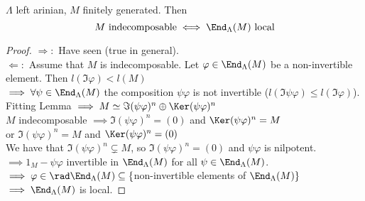 \begin{thm}
$\Lambda$ left arinian, $M$ finitely generated. Then \[M \text{ indecomposable} \iff \End_\Lambda(M) \text{ local}\]
\begin{proof}
\underline{$\Rightarrow:$} Have seen (true in general).\\
\underline{$\Leftarrow:$} Assume that $M$ is indecomposable. Let $\varphi \in \End_\Lambda(M)$ be a non-invertible element. Then $l(\Im \varphi) < l(M)$\\
$\implies \forall \psi \in \End_\Lambda(M)$ the composition $\psi\varphi$ is not invertible ($l(\Im \psi\varphi) \leq l(\Im \varphi)$).\\
Fitting Lemma $\implies M \simeq \Im (\psi\varphi)^n \oplus \Ker (\psi\varphi)^n$\\
$M$ indecomposable $\implies \Im (\psi \varphi)^n = (0)$ and $\Ker (\psi \varphi)^n = M$\\
or $\Im (\psi \varphi)^n = M$ and $\Ker (\psi \varphi)^n = (0)$\\
We have that $\Im (\psi \varphi)^n \subsetneq M$, so $\Im (\psi \varphi)^n = (0)$ and $\psi\varphi$ is nilpotent.\\
$\implies 1_M - \psi\varphi$ invertible in $\End_\Lambda(M)$ for all $\psi \in \End_\Lambda(M)$.\\
$\implies \varphi \in \rad \End_\Lambda(M) \subseteq \{ $non-invertible elements of $\End_\Lambda(M) \}$\\
$\implies \End_\Lambda(M)$ is local.
\end{proof}
\end{thm}


